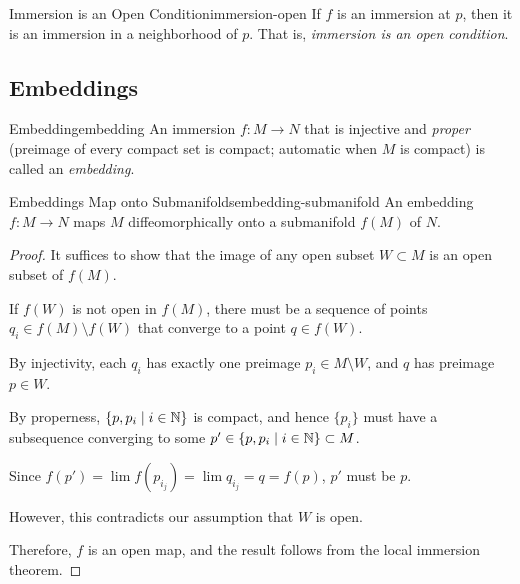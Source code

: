 \begin{corollary}{Immersion is an Open Condition}{immersion-open}
    If $f$ is an immersion at $p$, then it is an immersion in a neighborhood of $p$. That is, \emph{immersion is an open condition}.
\end{corollary}

\subsection{Embeddings}

\begin{definition}{Embedding}{embedding}
    An immersion $f \colon M \to N$ that is injective and \emph{proper} (preimage of every compact set is compact; automatic when $M$ is compact) is called an \emph{embedding}.
\end{definition}

\begin{theorem}{Embeddings Map onto Submanifolds}{embedding-submanifold}
    An embedding $f \colon M \to N$ maps $M$ diffeomorphically onto a submanifold $f(M)$ of $N$.
\end{theorem}

\begin{proof}
    It suffices to show that the image of any open subset $W \subset M$ is an open subset of $f(M)$.

    If $f(W)$ is not open in $f(M)$, there must be a sequence of points $q_i \in f(M) \setminus f(W)$ that converge to a point $q \in f(W)$.

    By injectivity, each $q_i$ has exactly one preimage $p_i \in M \setminus W$, and $q$ has preimage $p \in W$.

    By properness, $\{p, p_i \mid i \in \mathbb{N}\}$ is compact, and hence $\{p_i\}$ must have a subsequence converging to some $p' \in \{p, p_i \mid i \in \mathbb{N}\} \subset M$.

    Since $f(p') = \lim f(p_{i_j}) = \lim q_{i_j} = q = f(p)$, $p'$ must be $p$.

    However, this contradicts our assumption that $W$ is open.

    Therefore, $f$ is an open map, and the result follows from the local immersion theorem.
\end{proof}
